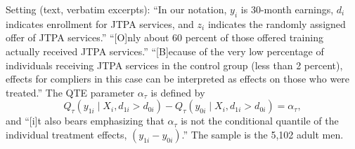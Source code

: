 \documentclass[11pt,a4paper]{article}
\begin{document}
\smallskip
\noindent Setting (text, verbatim excerpts): ``In our notation, $y_i$ is 30-month earnings, $d_i$ indicates
enrollment for JTPA services, and $z_i$ indicates the randomly assigned offer of JTPA services.'' ``[O]nly
about 60 percent of those offered training actually received JTPA services.'' ``[B]ecause of the very low
percentage of individuals receiving JTPA services in the control group (less than 2 percent), effects for
compliers in this case can be interpreted as effects on those who were treated.'' The QTE parameter
$\alpha_\tau$ is defined by
\[
Q_\tau(y_{1i}\mid X_i,d_{1i}>d_{0i})-Q_\tau(y_{0i}\mid X_i,d_{1i}>d_{0i})=\alpha_\tau,\tag{7.2.2}
\]
and ``[i]t also bears emphasizing that $\alpha_\tau$ is not the conditional quantile of the individual
treatment effects, $(y_{1i}-y_{0i})$.'' The sample is the 5,102 adult men.
\end{document}

